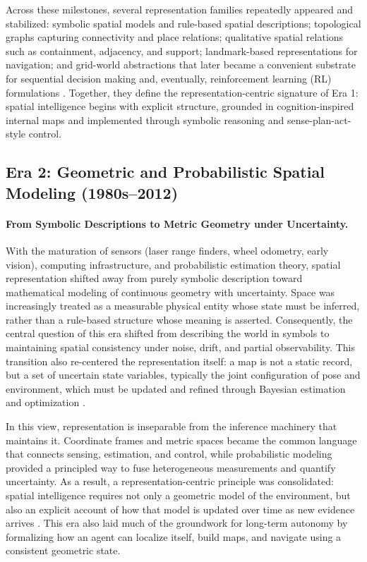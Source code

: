 Across these milestones, several representation families repeatedly appeared and stabilized: symbolic spatial models and rule-based spatial descriptions; topological graphs capturing connectivity and place relations; qualitative spatial relations such as containment, adjacency, and support; landmark-based representations for navigation; and grid-world abstractions that later became a convenient substrate for sequential decision making and, eventually, reinforcement learning (RL) formulations \cite{arulkumaran2017deep}.
Together, they define the representation-centric signature of Era 1: spatial intelligence begins with explicit structure, grounded in cognition-inspired internal maps and implemented through symbolic reasoning and sense-plan-act-style control.

\subsection{Era 2: Geometric and Probabilistic Spatial Modeling (1980s--2012)}
\label{subsec:era-geometric-probabilistic}


\paragraph{From Symbolic Descriptions to Metric Geometry under Uncertainty.}
With the maturation of sensors (laser range finders, wheel odometry, early vision), computing infrastructure, and probabilistic estimation theory, spatial representation shifted away from purely symbolic description toward mathematical modeling of continuous geometry with uncertainty.
Space was increasingly treated as a measurable physical entity whose state must be inferred, rather than a rule-based structure whose meaning is asserted.
Consequently, the central question of this era shifted from describing the world in symbols to maintaining spatial consistency under noise, drift, and partial observability.
This transition also re-centered the representation itself: a map is not a static record, but a set of uncertain state variables, typically the joint configuration of pose and environment, which must be updated and refined through Bayesian estimation and optimization \cite{Thrun2005Probabilistic,dellaert2006square}.

In this view, representation is inseparable from the inference machinery that maintains it.
Coordinate frames and metric spaces became the common language that connects sensing, estimation, and control, while probabilistic modeling provided a principled way to fuse heterogeneous measurements and quantify uncertainty.
As a result, a representation-centric principle was consolidated: spatial intelligence requires not only a geometric model of the environment, but also an explicit account of how that model is updated over time as new evidence arrives \cite{smith1990estimating,bar2001estimation,thrun2002robotic}.
This era also laid much of the groundwork for long-term autonomy by formalizing how an agent can localize itself, build maps, and navigate using a consistent geometric state.

